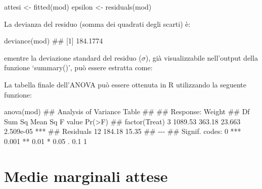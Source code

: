 \documentclass[a4paper,12pt,oneside]{book}
\newenvironment{Shaded}{\begin{snugshade}}{\end{snugshade}}
\newcommand{\SpecialCharTok}[1]{#1}
\newcommand{\DocumentationTok}[1]{#1}
\newcommand{\OtherTok}[1]{#1}
\newcommand{\FunctionTok}[1]{#1}
\newcommand{\NormalTok}[1]{#1}
\begin{document}
\begin{Shaded}
\begin{Highlighting}[]
\NormalTok{attesi }\OtherTok{\textless{}{-}} \FunctionTok{fitted}\NormalTok{(mod)}
\NormalTok{epsilon }\OtherTok{\textless{}{-}} \FunctionTok{residuals}\NormalTok{(mod)}
\end{Highlighting}
\end{Shaded}

La devianza del residuo (somma dei quadrati degli scarti) è:

\begin{Shaded}
\begin{Highlighting}[]
\FunctionTok{deviance}\NormalTok{(mod)}
\DocumentationTok{\#\# [1] 184.1774}
\end{Highlighting}
\end{Shaded}

ementre la deviazione standard del residuo (\(\sigma\)), già visualizzabile nell'output della funzione `summary()', può essere estratta come:

\begin{Shaded}
\end{Shaded}

La tabella finale dell'ANOVA può essere ottenuta in R utilizzando la seguente funzione:

\begin{Shaded}
\begin{Highlighting}[]
\FunctionTok{anova}\NormalTok{(mod)}
\DocumentationTok{\#\# Analysis of Variance Table}
\DocumentationTok{\#\# }
\DocumentationTok{\#\# Response: Weight}
\DocumentationTok{\#\#               Df  Sum Sq Mean Sq F value    Pr(\textgreater{}F)    }
\DocumentationTok{\#\# factor(Treat)  3 1089.53  363.18  23.663 2.509e{-}05 ***}
\DocumentationTok{\#\# Residuals     12  184.18   15.35                      }
\DocumentationTok{\#\# {-}{-}{-}}
\DocumentationTok{\#\# Signif. codes:  0 \textquotesingle{}***\textquotesingle{} 0.001 \textquotesingle{}**\textquotesingle{} 0.01 \textquotesingle{}*\textquotesingle{} 0.05 \textquotesingle{}.\textquotesingle{} 0.1 \textquotesingle{} \textquotesingle{} 1}
\end{Highlighting}
\end{Shaded}

\hypertarget{medie-marginali-attese}{%
\section{Medie marginali attese}\label{medie-marginali-attese}}
\end{document}
